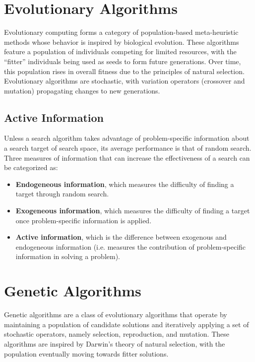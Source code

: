 \documentclass[12pt,titlepage]{article}
\begin{document}
  \newpage

  \section{Evolutionary Algorithms}
    Evolutionary computing forms a category of population-based meta-heuristic methods whose behavior is inspired by biological evolution. These algorithms feature a population of
    individuals competing for limited resources, with the ``fitter'' individuals being used as seeds to form future generations. Over time, this population rises in overall fitness
    due to the principles of natural selection. Evolutionary algorithms are stochastic, with variation operators (crossover and mutation) propagating changes to new generations.

    \subsection{Active Information}
      Unless a search algorithm takes advantage of problem-specific information about a search target of search space, its average performance is that of random search. Three measures of
      information that can increase the effectiveness of a search can be categorized as:
      \begin{itemize}
        \item \textbf{Endogeneous information}, which measures the difficulty of finding a target through random search.
        \item \textbf{Exogeneous information}, which measures the difficulty of finding a target once problem-specific information is applied.
        \item \textbf{Active information}, which is the difference between exogenous and endogeneous information (i.e. measures the contribution of problem-specific information in solving
          a problem).
      \end{itemize}

  \newpage

  \section{Genetic Algorithms}
    Genetic algorithms are a class of evolutionary algorithms that operate by maintaining a population of candidate solutions and iteratively applying a set of stochastic operators,
    namely selection, reproduction, and mutation. These algorithms are inspired by Darwin's theory of natural selection, with the population eventually moving towards fitter solutions.
\end{document}
